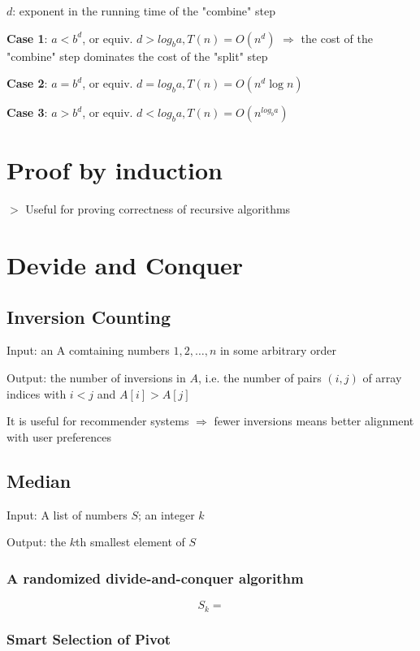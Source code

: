 \documentclass[12pt,a4paper]{article}
\newcommand{\remark}[1]{
    $>$ {\color{blue} #1}
}
\begin{document}
$d$: exponent in the running time of the "combine" step

\textbf{Case 1}: $a < b^d$, or equiv. $d > log_ba, T(n) = O(n^d)$
$\Rightarrow$ the cost of the "combine" step dominates the cost of the "split" step

\textbf{Case 2}: $a = b^d$, or equiv. $d = log_ba, T(n) = O(n^d \log n)$

\textbf{Case 3}: $a > b^d$, or equiv. $d < log_ba, T(n) = O(n^{log_ba})$

\section*{Proof by induction}

\remark{Useful for proving correctness of recursive algorithms}

\section*{Devide and Conquer}

\subsection*{Inversion Counting}

Input: an A comtaining numbers $1,2,\dots,n$ in some arbitrary order

Output: the number of inversions in $A$, i.e. the number of pairs $(i,j)$ of array indices with $i < j$ and $A[i] > A[j]$

It is useful for recommender systems $\Rightarrow$ fewer inversions means better alignment with user preferences

\subsection*{Median}

Input: A list of numbers $S$; an integer $k$

Output: the $k$th smallest element of $S$

\subsubsection{A randomized divide-and-conquer algorithm}


\[S_k = \]


\subsubsection*{Smart Selection of Pivot}
\end{document}
